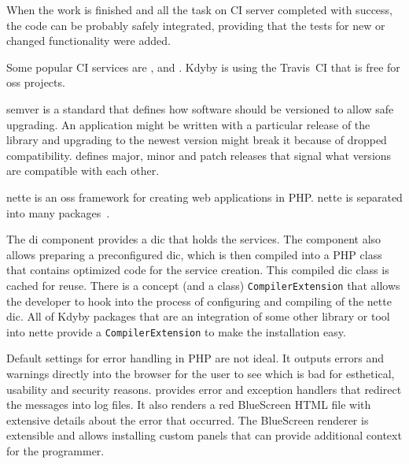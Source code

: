 When the work is finished and all the task on CI server completed with success, the code can be probably safely integrated, providing that the tests for new or changed functionality were added.

Some popular CI services are ,  and . Kdyby is using the Travis~CI that is free for \gls{oss} projects.

 \label{sec:theory:semver}

\gls{semver} is a standard that defines how software should be versioned to allow safe upgrading. An application might be written with a particular release of the library and upgrading to the newest version might break it because of dropped compatibility.  defines major, minor and patch releases that signal what versions are compatible with each other.

 \label{sec:theory:nette}

\gls{nette} is an \gls{oss} framework for creating web applications in PHP. \gls{nette} is separated into many packages~\cite{nette:introduction}.

The \gls{di} component  provides a \gls{dic} that holds the services. The component also allows preparing a preconfigured \gls{dic}, which is then compiled into a PHP class that contains optimized code for the service creation. This compiled \gls{dic} class is cached for reuse. There is a concept (and a class) \lstinline{CompilerExtension} that allows the developer to hook into the process of configuring and compiling of the \gls{nette} \gls{dic}. All of Kdyby packages that are an integration of some other library or tool into \gls{nette} provide a \lstinline{CompilerExtension} to make the installation easy.

Default settings for error handling in PHP are not ideal. It outputs errors and warnings directly into the browser for the user to see which is bad for esthetical, usability and security reasons.  provides error and exception handlers that redirect the messages into log files. It also renders a red BlueScreen HTML file with extensive details about the error that occurred. The BlueScreen renderer is extensible and allows installing custom panels that can provide additional context for the programmer.

